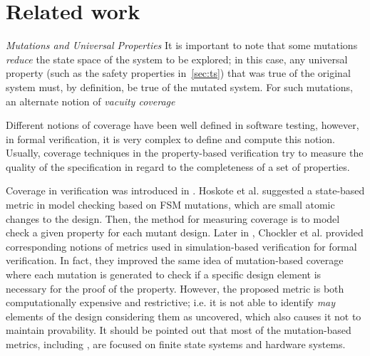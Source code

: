 \section{Related work}
\label{sec:related}

{\em Mutations and Universal Properties} It is important to note that some mutations {\em reduce} the state space of the system to be explored; in this case, any universal property (such as the safety properties in~\ref{sec:ts}) that was true of the original system must, by definition, be true of the mutated system.  For such mutations, an alternate notion of {\em vacuity coverage}


Different notions of coverage have been well defined in software testing, however, in formal verification, it is very complex to define and compute this notion.
Usually, coverage techniques in the property-based verification try to measure the quality of the specification in regard to the completeness of a set of properties.

Coverage in verification was introduced in \cite{hoskote1999coverage, katz1999have}. Hoskote et al. \cite{hoskote1999coverage} suggested a state-based metric in model checking based on FSM mutations, which are small atomic changes to the design. Then, the method for measuring coverage is to model check a given property for each mutant design.
Later in \cite{chockler_coverage_2003}, Chockler et al. provided corresponding notions of metrics used in simulation-based verification for formal verification. In fact, they improved the same idea of mutation-based coverage where each mutation is generated to check if a specific
design element is necessary for the proof of the property.
 However, the proposed metric is both computationally expensive and restrictive; i.e. it is not able to identify \emph{may} elements of the design considering them as uncovered, which also causes it not to maintain provability. It should be pointed out that most of the mutation-based metrics, including \cite{kupferman_theory_2008, chockler2001practical}, are focused on finite state systems and hardware systems.

